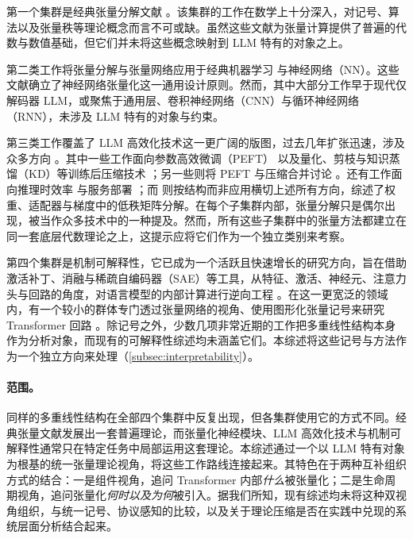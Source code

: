 第一个集群是经典张量分解文献 \cite{kolda2009tensor, cichocki2015tensor, cichocki2015tensor2, orus2014practical}。该集群的工作在数学上十分深入，对记号、算法以及张量秩等理论概念而言不可或缺。虽然这些文献为张量计算提供了普遍的代数与数值基础，但它们并未将这些概念映射到 LLM 特有的对象之上。

第二类工作将张量分解与张量网络应用于经典机器学习 \cite{sidiropoulos2017tensorsforspandml, ji2019tensorsformlsurvey1} 与神经网络（NN）\cite{panagakis2021tensorsfornn1, xinwei2024tensorsfornn2, wang2025tnmeetnn, he2026tensorsfornn3}。这些文献确立了神经网络张量化这一通用设计原则。然而，其中大部分工作早于现代仅解码器 LLM，或聚焦于通用层、卷积神经网络（CNN）与循环神经网络（RNN），未涉及 LLM 特有的对象与约束。

第三类工作覆盖了 LLM 高效化技术这一更广阔的版图，过去几年扩张迅速，涉及众多方向 \cite{wan2024efficientllmsurvey1}。其中一些工作面向参数高效微调（PEFT）\cite{wang2025peftsurvey1} 以及量化、剪枝与知识蒸馏（KD）等训练后压缩技术 \cite{zhu2024compressionsurvey1, tang2024compressionsurvey2, wang2024compressioninferencesurvey1}；另一些则将 PEFT 与压缩合并讨论 \cite{kim2025peftcompressionsurvey1}。还有工作面向推理时效率 \cite{zhou2024efficientinferencesurvey1, yuan2024efficientinferencesurvey2, li2025kvcachesurvey1} 与服务部署 \cite{miao2025efficientservingsurvey1}；而 \cite{Laura2026lowranksurvye} 则按结构而非应用横切上述所有方向，综述了权重、适配器与梯度中的低秩矩阵分解。在每个子集群内部，张量分解只是偶尔出现，被当作众多技术中的一种提及。然而，所有这些子集群中的张量方法都建立在同一套底层代数理论之上，这提示应将它们作为一个独立类别来考察。

第四个集群是机制可解释性，它已成为一个活跃且快速增长的研究方向，旨在借助激活补丁、消融与稀疏自编码器（SAE）等工具，从特征、激活、神经元、注意力头与回路的角度，对语言模型的内部计算进行逆向工程 \cite{somvanshi2026interpretabilitysurvey1, rai2025interpretabilitysurvey2, bereska2024interpretabilitysurvey3}。在这一更宽泛的领域内，有一个较小的群体专门透过张量网络的视角、使用图形化张量记号来研究 Transformer 回路 \cite{taylor2024interpretabilitysurvey4}。除记号之外，少数几项非常近期的工作把多重线性结构本身作为分析对象，而现有的可解释性综述均未涵盖它们。本综述将这些记号与方法作为一个独立方向来处理（\cref{subsec:interpretability}）。

\paragraph{范围。} 

同样的多重线性结构在全部四个集群中反复出现，但各集群使用它的方式不同。经典张量文献发展出一套普遍理论，而张量化神经模块、LLM 高效化技术与机制可解释性通常只在特定任务中局部运用这套理论。本综述通过一个以 LLM 特有对象为根基的统一张量理论视角，将这些工作路线连接起来。其特色在于两种互补组织方式的结合：一是组件视角，追问 Transformer 内部\emph{什么}被张量化；二是生命周期视角，追问张量化\emph{何时以及为何}被引入。据我们所知，现有综述均未将这种双视角组织，与统一记号、协议感知的比较，以及关于理论压缩是否在实践中兑现的系统层面分析结合起来。

